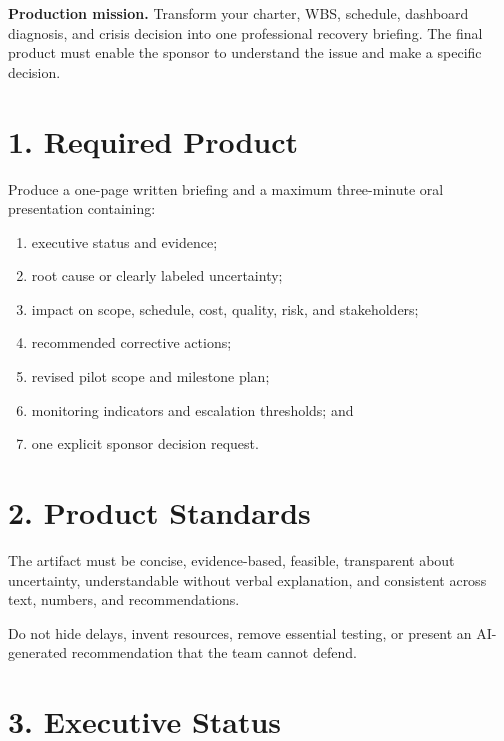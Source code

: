 \documentclass[11pt,a4paper]{article}
\begin{document}

\begin{activitybox}
\textbf{Production mission.} Transform your charter, WBS, schedule, dashboard diagnosis, and crisis decision into one professional recovery briefing. The final product must enable the sponsor to understand the issue and make a specific decision.
\end{activitybox}

\section{1. Required Product}

Produce a one-page written briefing and a maximum three-minute oral presentation containing:

\begin{enumerate}
  \item executive status and evidence;
  \item root cause or clearly labeled uncertainty;
  \item impact on scope, schedule, cost, quality, risk, and stakeholders;
  \item recommended corrective actions;
  \item revised pilot scope and milestone plan;
  \item monitoring indicators and escalation thresholds; and
  \item one explicit sponsor decision request.
\end{enumerate}

\section{2. Product Standards}

The artifact must be concise, evidence-based, feasible, transparent about uncertainty, understandable without verbal explanation, and consistent across text, numbers, and recommendations.

\begin{checkbox}
Do not hide delays, invent resources, remove essential testing, or present an AI-generated recommendation that the team cannot defend.
\end{checkbox}

\section{3. Executive Status}
\end{document}
